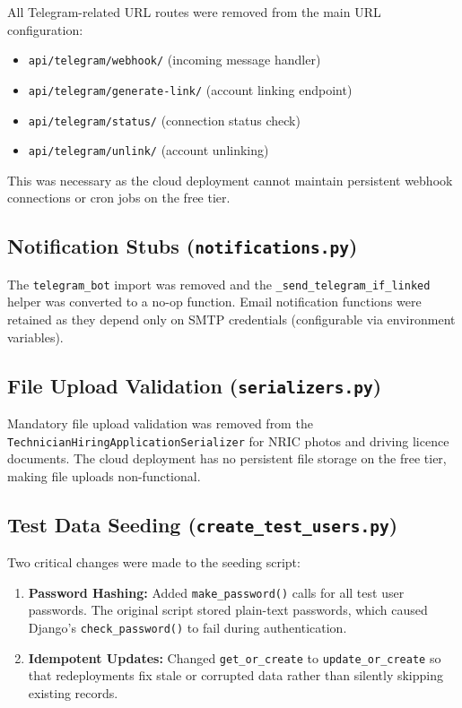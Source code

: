 \documentclass[conference]{IEEEtran}
\begin{document}
All Telegram-related URL routes were removed from the main URL configuration:

\begin{itemize}
    \item \texttt{api/telegram/webhook/} (incoming message handler)
    \item \texttt{api/telegram/generate-link/} (account linking endpoint)
    \item \texttt{api/telegram/status/} (connection status check)
    \item \texttt{api/telegram/unlink/} (account unlinking)
\end{itemize}

This was necessary as the cloud deployment cannot maintain persistent webhook connections or cron jobs on the free tier.

\subsection{Notification Stubs (\texttt{notifications.py})}

The \texttt{telegram\_bot} import was removed and the \texttt{\_send\_telegram\_if\_linked} helper was converted to a no-op function. Email notification functions were retained as they depend only on SMTP credentials (configurable via environment variables).

\subsection{File Upload Validation (\texttt{serializers.py})}

Mandatory file upload validation was removed from the \texttt{Technician\-Hiring\-Application\-Serializer} for NRIC photos and driving licence documents. The cloud deployment has no persistent file storage on the free tier, making file uploads non-functional.

\subsection{Test Data Seeding (\texttt{create\_test\_users.py})}
\label{sec:seed}

Two critical changes were made to the seeding script:

\begin{enumerate}
    \item \textbf{Password Hashing:} Added \texttt{make\_password()} calls for all test user passwords. The original script stored plain-text passwords, which caused Django's \texttt{check\_password()} to fail during authentication.
    \item \textbf{Idempotent Updates:} Changed \texttt{get\_or\_create} to \texttt{update\_or\_create} so that redeployments fix stale or corrupted data rather than silently skipping existing records.
\end{enumerate}
\end{document}
